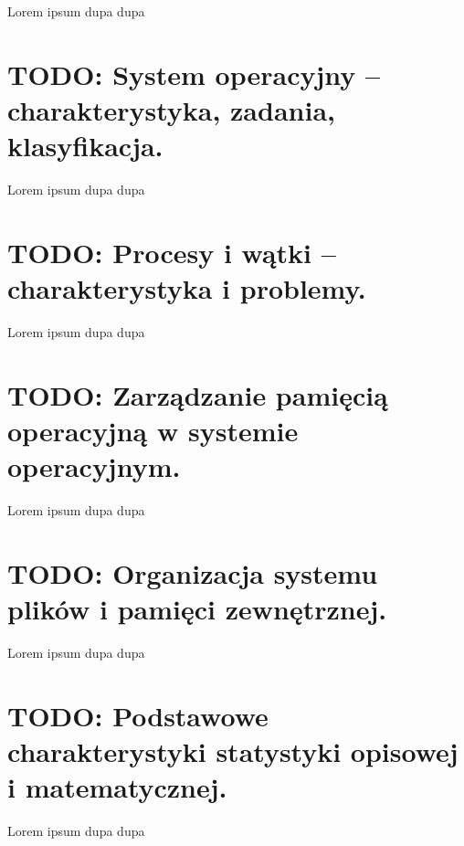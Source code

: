 \documentclass[a4paper,12pt,oneside]{book}
\begin{document}
						Lorem ipsum dupa dupa
	
	\setcounter{section}{23}
	\section{\color{red} TODO: System operacyjny – charakterystyka, zadania, klasyfikacja. }
						
						Lorem ipsum dupa dupa
	
	\setcounter{section}{24}
	\section{\color{red} TODO: Procesy i wątki – charakterystyka i problemy. }
						
						Lorem ipsum dupa dupa
	
	\setcounter{section}{25}
	\section{\color{red} TODO: Zarządzanie pamięcią operacyjną w systemie operacyjnym. }
						
						Lorem ipsum dupa dupa
	
	\setcounter{section}{26}
	\section{\color{red} TODO: Organizacja systemu plików i pamięci zewnętrznej. }
						
						Lorem ipsum dupa dupa
						
	\setcounter{section}{2}
	\section{\color{red} TODO: Podstawowe charakterystyki statystyki opisowej i matematycznej.}
							
							Lorem ipsum dupa dupa
	
	
	
	
\end{document}
